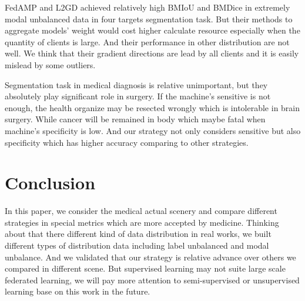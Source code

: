 \documentclass[journal]{IEEEtran}
\begin{document}
FedAMP and L2GD achieved relatively high BMIoU and BMDice in extremely modal unbalanced data in four targets segmentation task. But their methods to aggregate models' weight would cost higher calculate resource especially when the quantity of clients is large. And their performance in other distribution are not well. We think that their gradient directions are lead by all clients and it is easily mislead by some outliers.

Segmentation task in medical diagnosis is relative unimportant, but they absolutely play significant role in surgery. If the machine's sensitive is not enough, the health organize may be resected wrongly which is intolerable in brain surgery. While cancer will be remained in body which maybe fatal when machine's specificity is low. And our strategy not only considers sensitive but also specificity which has higher accuracy comparing to other strategies.

\section{Conclusion}
In this paper, we consider the medical actual scenery and compare different strategies in special metrics which are more accepted by medicine. Thinking about that there different kind of data distribution in real works, we built different types of distribution data including label unbalanced and modal unbalance. And we validated that our strategy is relative advance over others we compared in different scene. But supervised learning may not suite large scale federated learning, we will pay more attention to semi-supervised or unsupervised learning base on this work in the future.

  

\end{document}
